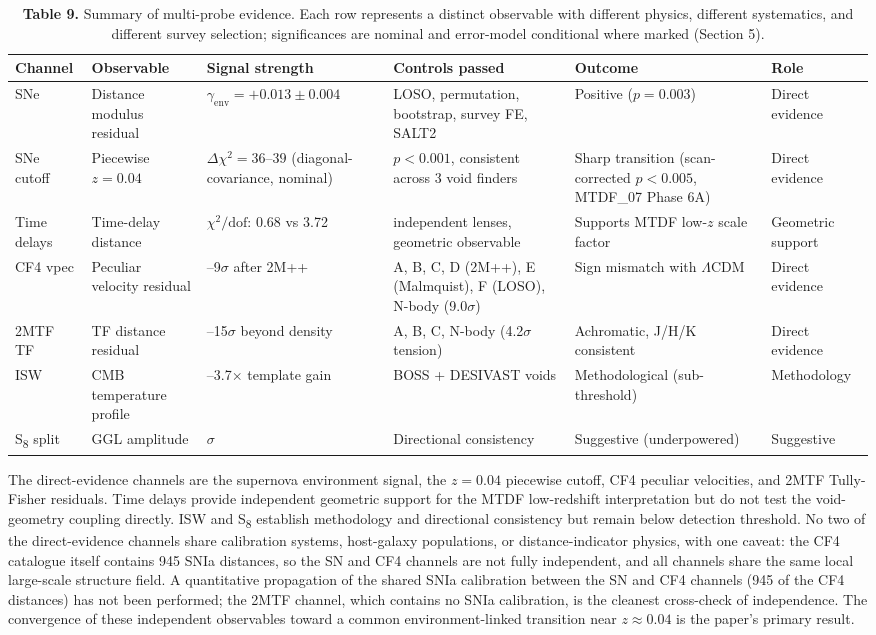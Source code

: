 \documentclass[11pt,a4paper]{article}
\begin{document}
\begin{table}[H]
\centering
\footnotesize
\caption{\textbf{Table 9.} Summary of multi-probe evidence. Each row represents a distinct observable with different physics, different systematics, and different survey selection; significances are nominal and error-model conditional where marked (Section 5).}
\begin{tabularx}{\linewidth}{l>{\RaggedRight\arraybackslash}X>{\RaggedRight\arraybackslash}X>{\RaggedRight\arraybackslash}X>{\RaggedRight\arraybackslash}X>{\RaggedRight\arraybackslash}X}
\toprule
\textbf{Channel} & \textbf{Observable} & \textbf{Signal strength} & \textbf{Controls passed} & \textbf{Outcome} & \textbf{Role} \tabularnewline
\midrule
SNe & Distance modulus residual & \(\gamma_\mathrm{env} = +0.013 \pm 0.004\) & LOSO, permutation, bootstrap, survey FE, SALT2 & Positive (\(p = 0.003\)) & Direct evidence \tabularnewline
SNe cutoff & Piecewise \(z = 0.04\) & \(\Delta\chi^2 = 36\text{--}39\) (diagonal-covariance, nominal) & \(p < 0.001\), consistent across 3 void finders & Sharp transition (scan-corrected \(p < 0.005\), MTDF\_\allowbreak{}07 Phase 6A) & Direct evidence \tabularnewline
Time delays & Time-delay distance & \(\chi^2/\mathrm{dof}\): 0.68 vs 3.72 & 7 independent lenses, geometric observable & Supports MTDF low-\(z\) scale factor & Geometric support \tabularnewline
CF4 vpec & Peculiar velocity residual & 5--9\(\sigma\) after 2M++ & A, B, C, D (2M++), E (Malmquist), F (LOSO), N-body (9.0\(\sigma\)) & Sign mismatch with \(\Lambda\)CDM & Direct evidence \tabularnewline
2MTF TF & TF distance residual & 4--15\(\sigma\) beyond density & A, B, C, N-body (4.2\(\sigma\) tension) & Achromatic, J/\allowbreak{}H/\allowbreak{}K consistent & Direct evidence \tabularnewline
ISW & CMB temperature profile & 2.4--3.7$\times$ template gain & BOSS + DESIVAST voids & Methodological (sub-threshold) & Methodology \tabularnewline
S\textsubscript{8} split & GGL amplitude & 1.71\(\sigma\) & Directional consistency & Suggestive (underpowered) & Suggestive \tabularnewline
\bottomrule
\end{tabularx}
\end{table}

The direct-evidence channels are the supernova environment signal, the \(z = 0.04\) piecewise cutoff, CF4 peculiar velocities, and 2MTF Tully-Fisher residuals. Time delays provide independent geometric support for the MTDF low-redshift interpretation but do not test the void-geometry coupling directly. ISW and S\textsubscript{8} establish methodology and directional consistency but remain below detection threshold. No two of the direct-evidence channels share calibration systems, host-galaxy populations, or distance-indicator physics, with one caveat: the CF4 catalogue itself contains 945 SNIa distances, so the SN and CF4 channels are not fully independent, and all channels share the same local large-scale structure field. A quantitative propagation of the shared SNIa calibration between the SN and CF4 channels (945 of the CF4 distances) has not been performed; the 2MTF channel, which contains no SNIa calibration, is the cleanest cross-check of independence. The convergence of these independent observables toward a common environment-linked transition near \(z \approx 0.04\) is the paper's primary result.
\end{document}
